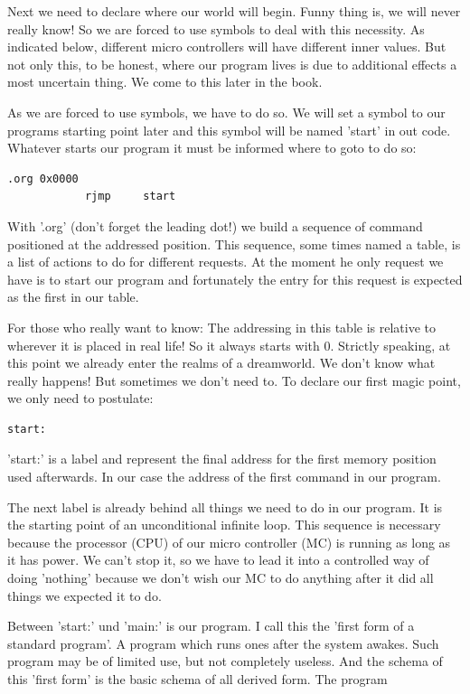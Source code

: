 Next we need to declare where our world will begin. Funny thing is, we will never really know! So we are forced to use symbols to deal with this necessity. As indicated below, different micro controllers will have different inner values. But not only this, to be honest, where our program lives is due to additional effects a most uncertain thing. We come to this later in the book.

As we are forced to use symbols, we have to do so. We will set a symbol to our programs starting point later and this symbol will be named 'start' in out code. Whatever starts our program it must be informed where to goto to do so:

\begin{lstlisting}
.org 0x0000
            rjmp     start 
\end{lstlisting}

With '.org' (don't forget the leading dot!) we build a sequence of command positioned at the addressed position. This sequence, some times named a table, is a list of actions to do for different requests. At the moment he only request we have is to start our program and fortunately the entry for this request is expected as the first in our table.

For those who really want to know: The addressing in this table is relative to wherever it is placed in real life! So it always starts with 0. Strictly speaking, at this point we already enter the realms of a dreamworld. We don't know what really happens! But sometimes we don't need to. To declare our first magic point, we only need to postulate:

\begin{lstlisting}
start:
\end{lstlisting}

'start:'  is a label and represent the final address for the first memory position used afterwards. In our case the address of the first command in our program.

The next label is already behind all things we need to do in our program. It is the starting point of an unconditional infinite loop. This sequence is necessary because the processor (CPU) of our micro controller (MC) is running as long as it has power. We can't stop it, so we have to lead it into a controlled way of doing 'nothing' because we don't wish our MC to do anything after it did all things we expected it to do.

Between 'start:' und 'main:' is our program. I call this the 'first form of a standard program'. A program which runs ones after the system awakes. Such program may be of limited use, but not completely useless. And the schema of this 'first form' is the basic schema of all derived form. The program 

